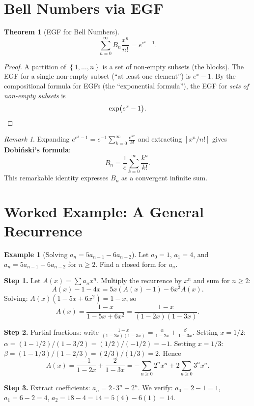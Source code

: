 \documentclass[12pt,a4paper,openany]{book}
\theoremstyle{definition}
\newtheorem{example}[definition]{Example}
\theoremstyle{plain}
\newtheorem{theorem}[definition]{Theorem}
\theoremstyle{remark}
\newtheorem{remark}[definition]{Remark}
\newcommand{\set}[1]{\left\{#1\right\}}
\begin{document}

\section{Bell Numbers via EGF}\label{sec:egf-bell}

\begin{theorem}[EGF for Bell Numbers]\label{thm:bell-egf}
\[
  \sum_{n=0}^{\infty}B_n\frac{x^n}{n!} = e^{e^x - 1}.
\]
\end{theorem}

\begin{proof}
A partition of $\set{1,\dots,n}$ is a set of non-empty subsets (the
blocks).  The EGF for a single non-empty subset (``at least one
element'') is $e^x - 1$.  By the compositional formula for EGFs (the
``exponential formula''), the EGF for
\emph{sets of non-empty subsets} is
\[
  \exp\bigl(e^x - 1\bigr). \qedhere
\]
\end{proof}

\begin{remark}\label{rem:bell-Dobinski}
Expanding $e^{e^x-1} = e^{-1}\sum_{k=0}^{\infty}\frac{e^{kx}}{k!}$
and extracting $[x^n/n!]$ gives \textbf{Dobi\'nski's formula}:
\[
  B_n = \frac{1}{e}\sum_{k=0}^{\infty}\frac{k^n}{k!}.
\]
This remarkable identity expresses $B_n$ as a convergent infinite sum.
\end{remark}



\section{Worked Example: A General Recurrence}\label{sec:ogf-worked}

\begin{example}[Solving $a_n = 5a_{n-1} - 6a_{n-2}$]\label{ex:ogf-recurrence}
Let $a_0 = 1$, $a_1 = 4$, and $a_n = 5a_{n-1} - 6a_{n-2}$ for $n\ge2$.
Find a closed form for $a_n$.

\textbf{Step 1.}  Let $A(x) = \sum a_n x^n$.  Multiply the recurrence
by $x^n$ and sum for $n \ge 2$:
\[
  A(x) - 1 - 4x = 5x(A(x) - 1) - 6x^2 A(x).
\]
Solving: $A(x)(1 - 5x + 6x^2) = 1 - x$, so
\[
  A(x) = \frac{1-x}{1-5x+6x^2} = \frac{1-x}{(1-2x)(1-3x)}.
\]

\textbf{Step 2.}  Partial fractions: write
$\frac{1-x}{(1-2x)(1-3x)} = \frac{\alpha}{1-2x}+\frac{\beta}{1-3x}$.
Setting $x = 1/2$: $\alpha = (1-1/2)/(1-3/2) = (1/2)/(-1/2) = -1$.
Setting $x = 1/3$: $\beta = (1-1/3)/(1-2/3) = (2/3)/(1/3) = 2$.
Hence
\[
  A(x) = \frac{-1}{1-2x} + \frac{2}{1-3x}
  = -\sum_{n\ge 0}2^n x^n + 2\sum_{n\ge 0}3^n x^n.
\]

\textbf{Step 3.}  Extract coefficients:
$a_n = 2\cdot 3^n - 2^n$.
We verify: $a_0 = 2-1 = 1$, $a_1 = 6-2 = 4$, $a_2 = 18-4 = 14 =
5(4)-6(1) = 14$.\checkmark
\end{example}
\end{document}
